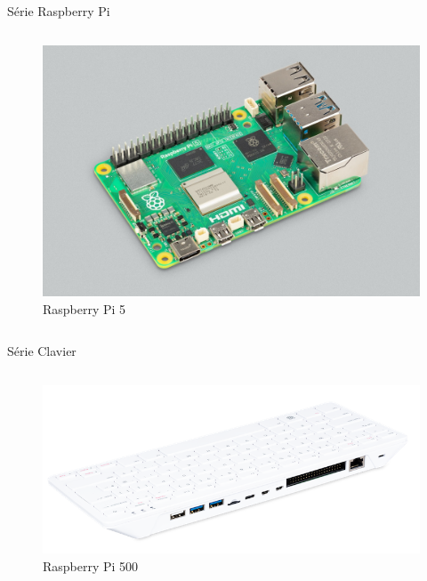 \documentclass[aspectratio=169,xcolor=dvipsnames]{beamer}
\begin{document}
\begin{frame}{Série Raspberry Pi}
    \begin{columns}[c] %

        \begin{figure}
            \includegraphics[width=1\textheight]{1/rpi-5.jpg}
            \captionsetup{labelformat=empty}
            \caption{Raspberry Pi 5}
        \end{figure}

    \end{columns}
\end{frame}


\begin{frame}{Série Clavier}
    \begin{columns}[c] %

        \begin{figure}
            \includegraphics[width=1\textheight]{1/rpi-500.png}
            \captionsetup{labelformat=empty}
            \caption{Raspberry Pi 500}
        \end{figure}

    \end{columns}
\end{frame}
\end{document}
